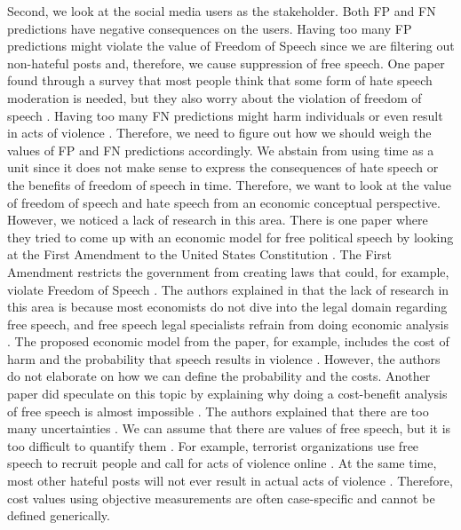 Second, we look at the social media users as the stakeholder.
%
Both FP and FN predictions have negative consequences on the users. 
%
Having too many FP predictions might violate the value of Freedom of Speech since we are filtering out non-hateful posts and, therefore, we cause suppression of free speech.
%
One paper found through a survey that most people think that some form of hate speech moderation is needed, but they also worry about the violation of freedom of speech \citep{olteanu2017limits}. 
%
Having too many FN predictions might harm individuals or even result in acts of violence \citep{ecri-hate-speech-and-violence}.
%
Therefore, we need to figure out how we should weigh the values of FP and FN predictions accordingly.
%
We abstain from using time as a unit since it does not make sense to express the consequences of hate speech or the benefits of freedom of speech in time.
%
Therefore, we want to look at the value of freedom of speech and hate speech from an economic conceptual perspective.
%
However, we noticed a lack of research in this area.
%
There is one paper where they tried to come up with an economic model for free political speech by looking at the First Amendment to the United States Constitution \citep{posner1986free}.
%
The First Amendment restricts the government from creating laws that could, for example, violate Freedom of Speech \citep{first-amendment-white-house}.
%
The authors explained in \citet{posner1986free} that the lack of research in this area is because most economists do not dive into the legal domain regarding free speech, and free speech legal specialists refrain from doing economic analysis \citep{posner1986free}.
%
The proposed economic model from the paper, for example, includes the cost of harm and the probability that speech results in violence \citep{posner1986free}.
%
However, the authors do not elaborate on how we can define the probability and the costs. Another paper did speculate on this topic by explaining why doing a cost-benefit analysis of free speech is almost impossible \citep{sunstein2018does}.
%
The authors explained that there are too many uncertainties \citep{sunstein2018does}.
%
We can assume that there are values of free speech, but it is too difficult to quantify them \citep{sunstein2018does}.
%
For example, terrorist organizations use free speech to recruit people and call for acts of violence online \citep{sunstein2018does}.
%
At the same time, most other hateful posts will not ever result in actual acts of violence \citep{sunstein2018does}.
%
Therefore, cost values using objective measurements are often case-specific and cannot be defined generically.
